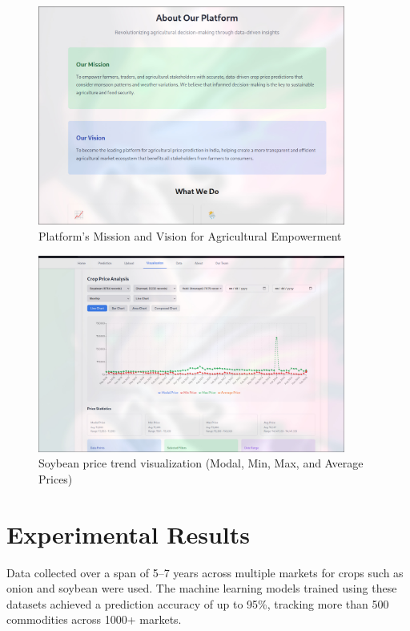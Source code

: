 \begin{figure}[H]
	\centering
	\includegraphics[width=0.9\textwidth]{Chapter5/WhatsApp Image 2025-07-04 at 22.18.33.jpeg}
	\caption{Platform's Mission and Vision for Agricultural Empowerment}
	\label{fig:ui2}
\end{figure}

\begin{figure}[H]
	\centering
	\includegraphics[width=0.9\textwidth]{Chapter5/WhatsApp Image 2025-07-04 at 22.18.31.jpeg}
	\caption{Soybean price trend visualization (Modal, Min, Max, and Average Prices)}
	\label{fig:ui3}
\end{figure}

\section{Experimental Results}
Data collected over a span of 5--7 years across multiple markets for crops such as onion and soybean were used. The machine learning models trained using these datasets achieved a prediction accuracy of up to 95\%, tracking more than 500 commodities across 1000+ markets.

